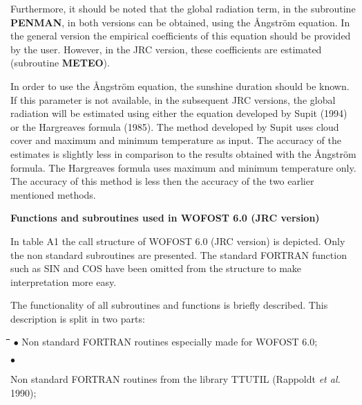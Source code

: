 Furthermore, it should be noted that the global radiation term, in the subroutine {\bf PEN\-MAN}, in both versions can be obtained, using the \AA ngstr\"{o}m equation. In the general
version the empirical coefficients of this equation should be provided by the user.
However, in the JRC version, these coefficients are estimated (subroutine {\bf METEO}). 

In order to use the \AA ngstr\"{o}m equation, the sunshine duration should be known. If this
parame\-ter is not available, in the subsequent JRC versions, the global radiation will be
estimated using either the equation developed by Supit (1994) or the Hargreaves formula
(1985). The method developed by Supit uses cloud cover and maximum and minimum
temperature as input. The accuracy of the estimates is slightly less in comparison to the
results obtained with the \AA ngstr\"{o}m formula. The Hargreaves formula uses maximum and
minimum temperature only. The accuracy of this method is less then the accuracy of the
two earlier mentioned methods.

\bigskip
{\large {\bf Functions and subroutines used in WOFOST 6.0 (JRC version)}}

In table A1 the call structure of WOFOST 6.0 (JRC version) is depicted. Only the non
standard subroutines are presented. The standard FORTRAN function such as SIN and
COS have been omitted from the structure to make interpretation more easy. 

The functionality of all subroutines and functions is briefly described. This description is
split in two parts:\nwln
\begin{tabbing}
\hspace{1.27cm}\=\hspace{1.27cm}\=\hspace{1.27cm}\=\hspace{1.27cm}\=%
\hspace{1.27cm}\=\hspace{1.27cm}\=\hspace{1.27cm}\=\hspace{1.27cm}\=%
\hspace{1.27cm}\=\hspace{1.27cm}\=\kill
$\bullet$\> Non standard FORTRAN routines especially made for WOFOST 6.0;
\end{tabbing}
$\bullet$ 
\testlastline

\begin{indenting}{1.27cm}
Non standard FORTRAN routines from the library TTUTIL (Rappoldt {\it et al.\/}
1990);
\end{indenting}

